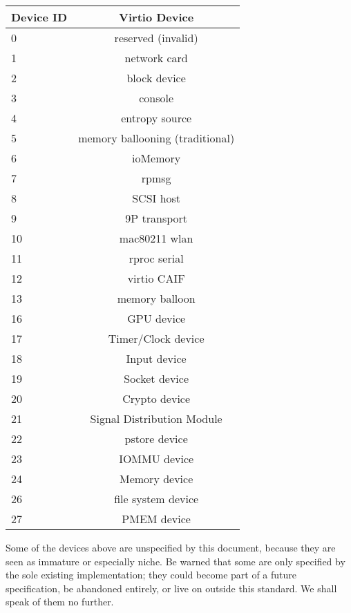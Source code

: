 \begin{tabular} { |l|c| }
\hline
Device ID  &  Virtio Device    \\
\hline \hline
0          & reserved (invalid) \\
\hline
1          &   network card     \\
\hline
2          &   block device     \\
\hline
3          &      console       \\
\hline
4          &  entropy source    \\
\hline
5          & memory ballooning (traditional)  \\
\hline
6          &     ioMemory       \\
\hline
7          &       rpmsg        \\
\hline
8          &     SCSI host      \\
\hline
9          &   9P transport     \\
\hline
10         &   mac80211 wlan    \\
\hline
11         &   rproc serial     \\
\hline
12         &   virtio CAIF      \\
\hline
13         &  memory balloon    \\
\hline
16         &   GPU device       \\
\hline
17         &   Timer/Clock device \\
\hline
18         &   Input device \\
\hline
19         &   Socket device \\
\hline
20         &   Crypto device \\
\hline
21         &   Signal Distribution Module \\
\hline
22         &   pstore device \\
\hline
23         &   IOMMU device \\
\hline
24         &   Memory device \\
\hline
26         &   file system device \\
\hline
27         &   PMEM device \\
\hline
\end{tabular}

Some of the devices above are unspecified by this document,
because they are seen as immature or especially niche.  Be warned
that some are only specified by the sole existing implementation;
they could become part of a future specification, be abandoned
entirely, or live on outside this standard.  We shall speak of
them no further.

